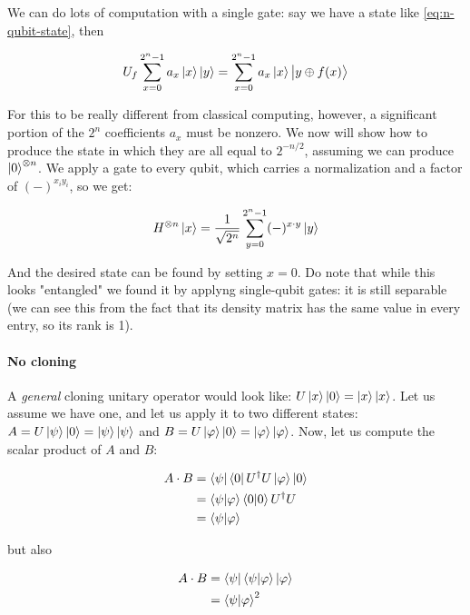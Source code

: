 \documentclass[main.tex]{subfiles}
\begin{document}
We can do lots of computation with a single gate: say we have a state like \eqref{eq:n-qubit-state}, then

\begin{equation}
    U_f \sum _{x=0}^{2^n-1} a_x \ket{x} \ket{y}  = \sum _{x=0}   ^{2^n-1} a_x \ket{x} \ket{y \oplus f(x)}
\end{equation}

For this to be really different from classical computing, however, a significant portion of the \(2^n\) coefficients \(a_x\) must be nonzero. We now will show how to produce the state in which they are all equal to \(2^{-n/2}\), assuming we can produce \(\ket{0} ^{\otimes n}\). We apply a  gate to every qubit, which carries a normalization and a factor of \((-)^{x_i y_i}\), so we get:

\begin{equation}
    H ^{\otimes n} \ket{x} = \frac{1}{\sqrt{2^n} } \sum _{y=0}   ^{2^n -1} (-)^{x\cdot y} \ket{y}
\end{equation}

And the desired state can be found by setting \(x = 0\). Do note that while this looks "entangled" we found it by applyng single-qubit gates: it is still separable (we can see this from the fact that its density matrix has the same value in every entry, so its rank is 1).

\paragraph{No cloning}

A  \emph{general}  cloning unitary operator would look like: \(U \ket{x} \ket{0} = \ket{x} \ket{x} \).
Let us assume we have one, and let us apply it to two different states: \(A = U\ket{\psi}\ket{0}=\ket{\psi} \ket{\psi }  \) and \(B = U\ket{\varphi} \ket{0} = \ket{\varphi} \ket{\varphi} \). Now, let us compute the scalar product of \(A\) and \(B\):

\begin{subequations}
\begin{align}
  A \cdot B &= \bra{\psi} \bra{0} U^\dag  U\ket{\varphi} \ket{0}  \\
  &= \braket{\psi}{\varphi} \braket{0}{0} U^\dag U  \\
  &= \braket{\psi}{\varphi}
\end{align}
\end{subequations}

but also

\begin{subequations}
\begin{align}
  A \cdot B &= \bra{\psi} \bra{\psi}  \ket{\varphi} \ket{\varphi}   \\
  &= \braket{\psi}{\varphi}^2
\end{align}
\end{subequations}
\end{document}
